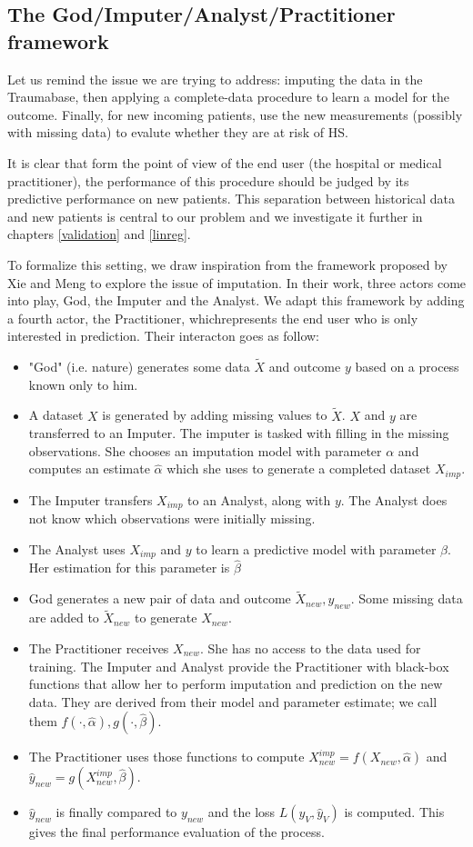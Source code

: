 		\subsection{The God/Imputer/Analyst/Practitioner framework}
Let us remind the issue we are trying to address: imputing the data in the Traumabase, then applying a complete-data procedure to learn a model for the outcome. Finally, for new  incoming patients, use the new measurements (possibly with missing data) to evalute whether they are at risk of HS. 

It is clear that form the point of view of the end user (the hospital or medical practitioner), the performance of this procedure should be judged by its predictive performance on new patients. This separation between historical data and new patients is central to our problem and we investigate it further in chapters \ref{validation} and \ref{linreg}.

To formalize this setting, we draw inspiration from the framework proposed by Xie and Meng \cite{xie_meng} to explore the issue of imputation. In their work, three actors come into play, God, the Imputer and the Analyst. We adapt this framework by adding a fourth actor, the Practitioner, whichrepresents the end user who is only interested in prediction. Their interacton goes as follow:
\begin{itemize}
 \item "God" (i.e. nature) generates some data $\tilde{X}$ and outcome $y$ based on a process known only to him. 
 \item A dataset $X$ is generated by adding missing values to $\tilde{X}$. $X$ and $y$ are transferred to an Imputer. The imputer is tasked with filling in the missing observations. She chooses an imputation model with parameter $\alpha$ and computes an estimate $\hat{\alpha}$ which she uses to generate a completed dataset $X_{imp}$.
 \item  The Imputer transfers $X_{imp}$ to an Analyst, along with $y$. The Analyst does not know which observations were initially missing.
 \item The Analyst uses $X_{imp}$ and $y$ to learn a predictive model with parameter $\beta$. Her estimation for this parameter is $\hat{\beta}$
 \item God generates a new pair of data and outcome $\tilde{X}_{new}, y_{new}$. Some missing data are added to  $\tilde{X}_{new}$ to generate $X_{new}$.
 \item The Practitioner receives $X_{new}$. She has no access to the data used for training. The Imputer and Analyst provide the Practitioner with black-box functions that allow her to perform imputation and prediction on the new data. They are derived from their model and parameter estimate; we call them $f(\cdot,\hat{\alpha}),g(\cdot,\hat{\beta})$.
 \item The Practitioner uses those functions to compute $X_{new}^{imp} = f(X_{new},\hat{\alpha})$ and $\hat{y}_{new}= g(X_{new}^{imp},\hat{\beta})$.
 \item $\hat{y}_{new}$ is finally compared to $y_{new}$ and the loss $L(y_V, \hat{y}_V)$ is computed. This gives the final performance evaluation of the process.
\end{itemize}

